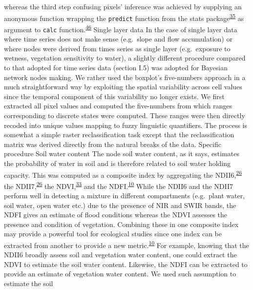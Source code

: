 \documentclass[12pt,oneside]{article}
\begin{document}
whereas the third step confusing pixels' inference was achieved by
supplying an anonymous function wrapping the \texttt{predict} function
from the stats
package\textsuperscript{\protect\hyperlink{ref-RCoreTeam_2018}{35}} as
argument to \texttt{calc}
function.\textsuperscript{\protect\hyperlink{ref-Hijmans_2019}{46}}
Single layer data In the case of single layer data where time series
does not make sense (e.g.~slope and flow accumulation) or where nodes
were derived from times series as single layer (e.g.~exposure to
wetness, vegetation sensitivity to water), a slightly different
procedure compared to that adopted for time series data (section I.5)
was adopted for Bayesian network nodes making. We rather used the
boxplot's five-numbers approach in a much straightforward way by
exploiting the spatial variability across cell values since the temporal
component of this variability no longer exists. We first extracted all
pixel values and computed the five-numbers from which ranges
corresponding to discrete states were computed. These ranges were then
directly recoded into unique values mapping to fuzzy linguistic
quantifiers. The process is somewhat a simple raster reclassification
task except that the reclassification matrix was derived directly from
the natural breaks of the data. Specific procedure Soil water content
The node soil water content, as it says, estimates the probability of
water in soil and is therefore related to soil water holding capacity.
This was computed as a composite index by aggregating the
NDII6,\textsuperscript{\protect\hyperlink{ref-Hunt_and_Rock_1989}{26}}
the
NDII7,\textsuperscript{\protect\hyperlink{ref-Hunt_and_Rock_1989}{26}}
the NDVI,\textsuperscript{\protect\hyperlink{ref-Tucker_1979}{33}} and
the
NDFI.\textsuperscript{\protect\hyperlink{ref-Boschetti_et_al_2014}{10}}
While the NDII6 and the NDII7 perform well in detecting a mixture in
different compartments (e.g.~plant water, soil water, open water etc.)
due to the presence of NIR and SWIR bands, the NDFI gives an estimate of
flood conditions whereas the NDVI assesses the presence and condition of
vegetation. Combining these in one composite index may provide a
powerful tool for ecological studies since one index can be extracted
from another to provide a new
metric.\textsuperscript{\protect\hyperlink{ref-Boschetti_et_al_2014}{10}}
For example, knowing that the NDII6 broadly assess soil and vegetation
water content, one could extract the NDVI to estimate the soil water
content. Likewise, the NDFI can be extracted to provide an estimate of
vegetation water content. We used such assumption to estimate the soil
\end{document}
